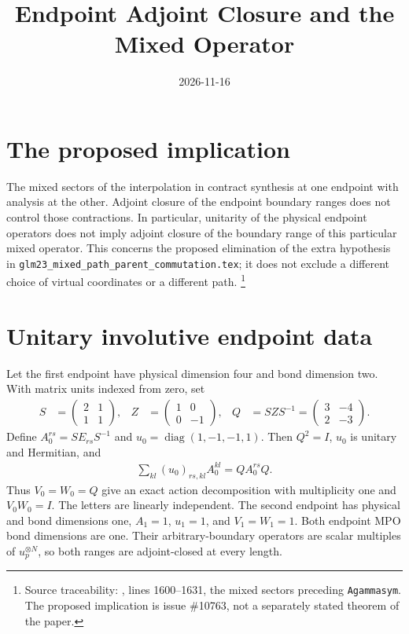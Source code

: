 \documentclass{article}
\title{Endpoint Adjoint Closure and the Mixed Operator}
\author{}
\date{2026-11-16}
\begin{document}
\maketitle
{}

\section{The proposed implication}
The mixed sectors of the interpolation in
\cite[Section~5]{GarreRubio2023MPOSym} contract synthesis at one
endpoint with analysis at the other. Adjoint closure of the endpoint
boundary ranges does not control those contractions. In particular,
unitarity of the physical endpoint operators does not imply adjoint
closure of the boundary range of this particular mixed operator.
This concerns the proposed elimination of the extra hypothesis in
\texttt{glm23\_mixed\_path\_parent\_commutation.tex}; it does not
exclude a different choice of virtual coordinates or a different path.
\footnote{Source traceability: ,
    lines 1600--1631, the mixed sectors preceding \texttt{Agammasym}.
    The proposed implication is issue \#10763, not a separately stated
    theorem of the paper.}

\section{Unitary involutive endpoint data}
Let the first endpoint have physical dimension four and bond dimension
two. With matrix units indexed from zero, set
\begin{align}
    S & =\begin{pmatrix}2&1\\1&1\end{pmatrix},            &
    Z & =\begin{pmatrix}1&0\\0&-1\end{pmatrix},           &
    Q & =SZS^{-1}=\begin{pmatrix}3&-4\\2&-3\end{pmatrix}.
    \label{eq:mea_virtual}
\end{align}
Define $A_0^{rs}=SE_{rs}S^{-1}$ and
$u_0=\operatorname{diag}(1,-1,-1,1)$. Then $Q^2=I$, $u_0$ is
unitary and Hermitian, and
\begin{align}
    \sum_{kl}(u_0)_{rs,kl}A_0^{kl}=QA_0^{rs}Q.
    \label{eq:mea_action}
\end{align}
Thus $V_0=W_0=Q$ give an exact action decomposition with multiplicity
one and $V_0W_0=I$. The letters are linearly independent. The second
endpoint has physical and bond dimensions one, $A_1=1$, $u_1=1$,
and $V_1=W_1=1$. Both endpoint MPO bond dimensions are one.
Their arbitrary-boundary operators are scalar multiples of
$u_p^{\otimes N}$, so both ranges are adjoint-closed at every length.
\end{document}
